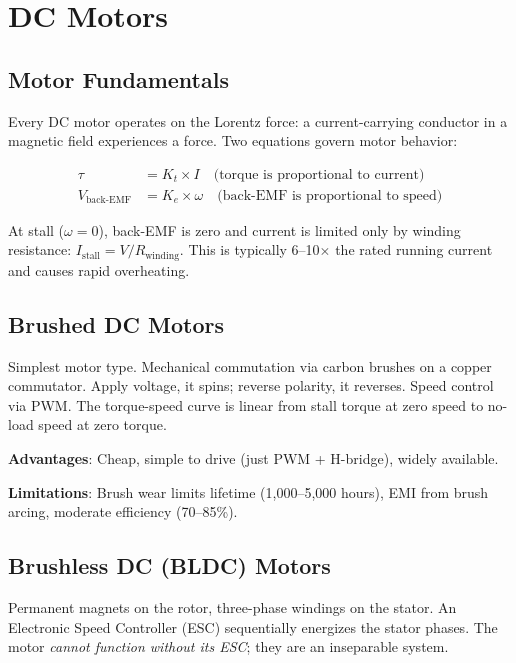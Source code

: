 \documentclass[11pt,letterpaper,twoside,openany]{book}
\begin{document}
\section{DC Motors}

\subsection{Motor Fundamentals}

Every DC motor operates on the Lorentz force: a current-carrying conductor in a magnetic field experiences a force. Two equations govern motor behavior:

\begin{align}
  \tau &= K_t \times I \quad \text{(torque is proportional to current)} \\
  V_{\text{back-EMF}} &= K_e \times \omega \quad \text{(back-EMF is proportional to speed)}
\end{align}

At stall ($\omega = 0$), back-EMF is zero and current is limited only by winding resistance: $I_{\text{stall}} = V / R_{\text{winding}}$. This is typically 6--10$\times$ the rated running current and causes rapid overheating.

\subsection{Brushed DC Motors}

Simplest motor type. Mechanical commutation via carbon brushes on a copper commutator. Apply voltage, it spins; reverse polarity, it reverses. Speed control via PWM. The torque-speed curve is linear from stall torque at zero speed to no-load speed at zero torque.

\textbf{Advantages}: Cheap, simple to drive (just PWM + H-bridge), widely available.

\textbf{Limitations}: Brush wear limits lifetime (1,000--5,000 hours), EMI from brush arcing, moderate efficiency (70--85\%).

\subsection{Brushless DC (BLDC) Motors}

Permanent magnets on the rotor, three-phase windings on the stator. An Electronic Speed Controller (ESC) sequentially energizes the stator phases. The motor \emph{cannot function without its ESC}; they are an inseparable system.
\end{document}
